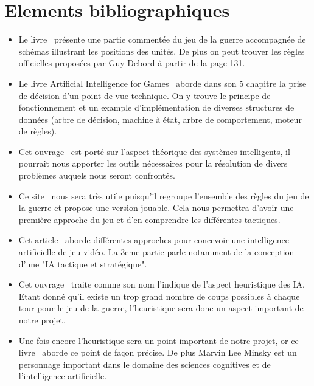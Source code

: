\documentclass[12pt]{article}
\begin{document}
	\section{Elements bibliographiques}
	\begin{itemize}
		\item Le livre~\cite{ref1} présente une partie commentée du jeu de la guerre accompagnée de schémas illustrant les positions des unités. De plus on peut trouver les règles officielles proposées par Guy Debord à partir de la page 131.
		~~\\

		\item Le livre Artificial Intelligence for Games~\cite{ref2} aborde dans son 5 chapitre la prise de décision d'un point de vue technique. On y trouve le principe de fonctionnement et un example d'implémentation de diverses structures de données (arbre de décision, machine à état, arbre de comportement, moteur de règles).
		~~\\


		\item Cet ouvrage~\cite{ref3} est porté sur l'aspect théorique des systèmes intelligents, il pourrait nous apporter les outils nécessaires pour la résolution de divers problèmes auquels nous seront confrontés.
		~~\\

		\item Ce site~\cite{ref4} nous sera très utile puisqu'il regroupe l'ensemble des règles du jeu de la guerre et propose une version jouable. Cela nous permettra d'avoir une première approche du jeu et d'en comprendre les différentes tactiques.
		~~\\

		\item Cet article~\cite{ref6} aborde différentes approches pour concevoir une intelligence artificielle de jeu vidéo. La 3eme partie parle notamment de la conception d'une "IA tactique et stratégique".
		~~\\

		\item Cet ouvrage~\cite{ref7} traite comme son nom l'indique de l'aspect heuristique des IA. Etant donné qu'il existe un trop grand nombre de coups possibles à chaque tour pour le jeu de la guerre, l'heuristique sera donc un aspect important de notre projet.
		~~\\

		\item Une fois encore l'heuristique sera un point important de notre projet, or ce livre~\cite{ref8} aborde ce point de façon précise. De plus Marvin Lee Minsky est un personnage important dans le domaine des sciences cognitives et de l'intelligence artificielle.
		~~\\


\end{itemize}
\end{document}
